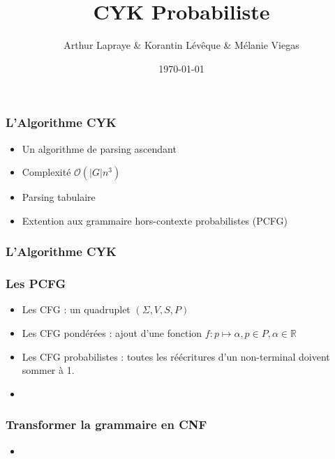 \documentclass{beamer}
\begin{document}
\title{CYK Probabiliste}  %
\author{ Arthur Lapraye \& Korantin Lévêque \& Mélanie Viegas }

\date{\today}


\begin{frame}
 \maketitle
\end{frame}

\begin{frame}
\frametitle{L'Algorithme CYK}
\begin{itemize}
  \item<1-4>{Un algorithme de parsing ascendant}
  \item<2-4>{Complexité $\mathcal{O}(|G|n^3) $ } %
  \item<3-4>{Parsing tabulaire}
  \item<4>{Extention aux grammaire hors-contexte probabilistes (PCFG)}
 \end{itemize}
 
\end{frame}

\begin{frame}
 \frametitle{L'Algorithme CYK}

\end{frame}

\begin{frame}
 \frametitle{Les PCFG}
 \begin{itemize}
  \item<1-4>{Les CFG : un quadruplet $(\Sigma,V,S,P)$ }
  \item<2-4>{Les CFG pondérées : ajout d'une fonction $ f : p \mapsto \alpha, p \in P, \alpha \in \mathbb{R} $ }
  \item<3-4>{Les CFG probabilistes : toutes les réécritures d'un non-terminal doivent sommer à 1. }
  \item<4>{  }
 \end{itemize}

\end{frame}


\begin{frame}
 \frametitle{Transformer la grammaire en CNF}
 \begin{itemize}
  \item<1>
 \end{itemize}

 
\end{frame}
\end{document}
